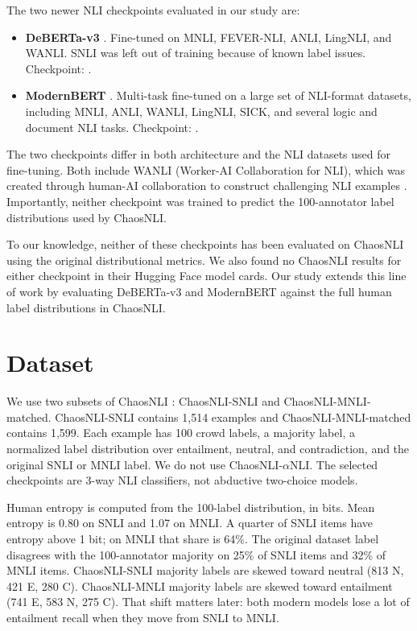 \documentclass[11pt,a4paper]{article}
\begin{document}
The two newer NLI checkpoints evaluated in our study are:

\begin{itemize}[itemsep=0.4em, topsep=0.4em]
\item \textbf{DeBERTa-v3} \cite{he2023debertav3,laurer2024less}. Fine-tuned on MNLI, FEVER-NLI, ANLI, LingNLI, and WANLI. SNLI was left out of training because of known label issues. Checkpoint: .
\item \textbf{ModernBERT} \cite{warner2024modernbert,sileo2024tasksource}. Multi-task fine-tuned on a large set of NLI-format datasets, including MNLI, ANLI, WANLI, LingNLI, SICK, and several logic and document NLI tasks. Checkpoint: .
\end{itemize}

The two checkpoints differ in both architecture and the NLI datasets used for fine-tuning. Both include WANLI (Worker-AI Collaboration for NLI), which was created through human-AI collaboration to construct challenging NLI examples \cite{liu2022wanli}. Importantly, neither checkpoint was trained to predict the 100-annotator label distributions used by ChaosNLI.

To our knowledge, neither of these checkpoints has been evaluated on ChaosNLI using the original distributional metrics. We also found no ChaosNLI results for either checkpoint in their Hugging Face model cards. Our study extends this line of work by evaluating DeBERTa-v3 and ModernBERT against the full human label distributions in ChaosNLI.

\section{Dataset}

We use two subsets of ChaosNLI \cite{nie2020chaosnli}: ChaosNLI-SNLI and ChaosNLI-MNLI-matched. ChaosNLI-SNLI contains 1,514 examples and ChaosNLI-MNLI-matched contains 1,599. Each example has 100 crowd labels, a majority label, a normalized label distribution over entailment, neutral, and contradiction, and the original SNLI or MNLI label. We do not use ChaosNLI-$\alpha$NLI. The selected checkpoints are 3-way NLI classifiers, not abductive two-choice models.

Human entropy is computed from the 100-label distribution, in bits. Mean entropy is 0.80 on SNLI and 1.07 on MNLI. A quarter of SNLI items have entropy above 1 bit; on MNLI that share is 64\%. The original dataset label disagrees with the 100-annotator majority on 25\% of SNLI items and 32\% of MNLI items. ChaosNLI-SNLI majority labels are skewed toward neutral (813 N, 421 E, 280 C). ChaosNLI-MNLI majority labels are skewed toward entailment (741 E, 583 N, 275 C). That shift matters later: both modern models lose a lot of entailment recall when they move from SNLI to MNLI.
\end{document}

